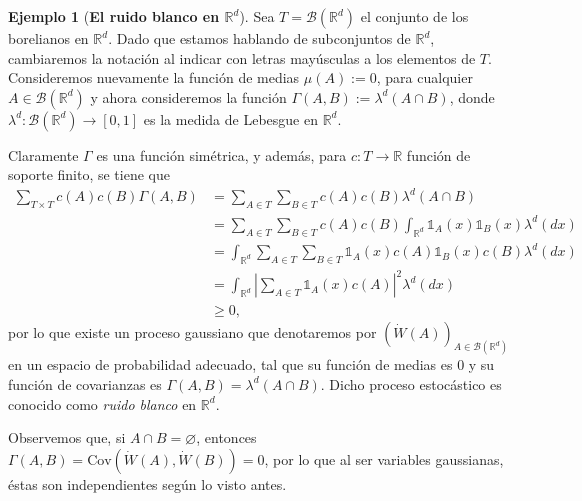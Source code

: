 \documentclass[letterpaper,twoside,12pt]{book}
\newcommand{\R}{\mathbb{R}}
\newcommand{\B}{\mathcal{B}}
\newcommand{\W}{\dot{W}}
\newcommand{\1}{\mathds{1}}
\newcommand{\abs}[1]{\left\lvert #1 \right\rvert}
\renewcommand{\to}{\rightarrow}
\theoremstyle{definition}
\theoremstyle{definition}
\theoremstyle{remark}
\theoremstyle{definition}
\theoremstyle{definition}
\theoremstyle{definition}
\theoremstyle{definition}
\newtheorem{ejem}{Ejemplo}
\theoremstyle{definition}
\begin{document}
\begin{ejem}[\textbf{El ruido blanco en $\R^{d}$}] 
Sea $T=\B(\R^{d})$ el conjunto de los borelianos en $\R^d$.
Dado que estamos hablando de subconjuntos de $\R^{d}$, cambiaremos la notación al indicar con letras mayúsculas a los elementos de $T$.
Consideremos nuevamente la función de medias $\mu(A):=0$, para cualquier $A\in \B(\R^{d})$ y ahora consideremos la función $\Gamma(A,B):=\lambda^{d}(A\cap B)$, donde $\lambda^{d}:\B(\R^{d})\to [0,1]$ es la medida de Lebesgue en $\R^{d}$.

 Claramente $\Gamma$ es una función simétrica, y además, para $c:T\to\R$ función de soporte finito, se tiene que 
 \begin{align*}
    \sum_{T\times T}^{}c(A)c(B)\Gamma(A,B)&=\sum_{A\in T}^{}\sum_{B\in T}c(A)c(B)\lambda^{d}(A\cap B)\\
    &=\sum_{A\in T}^{}\sum_{B\in T}c(A)c(B)\int_{\R^d}\1_{A}(x)\1_{B}(x)\lambda^{d}(dx)\\
    &=\int_{\R^{d}}\sum_{A\in T}\sum_{B\in T}\1_{A}(x)c(A)\1_{B}(x)c(B)\lambda^{d}(dx)\\
    &=\int_{\R^{d}}\abs{\sum_{A\in T}\1_{A}(x)c(A)}^2\lambda^{d}(dx)\\
    &\geq0,
    \end{align*}
por lo que existe un proceso gaussiano que denotaremos por $(\dot{W}(A))_{A\in \B(\R^{d})}$ en un espacio de probabilidad adecuado, tal que su función de medias es $0$ y su función de covarianzas es $\Gamma(A,B)=\lambda^{d}(A\cap B)$. Dicho proceso estocástico es conocido como \textit{ruido blanco} en $\R^{d}$.

Observemos que, si $A\cap B=\varnothing$, entonces $\Gamma(A,B)=\text{Cov}\left(\W(A),\W(B)\right)=0$, por lo que al ser variables gaussianas, éstas son independientes según lo visto antes.


\end{ejem}
\end{document}
